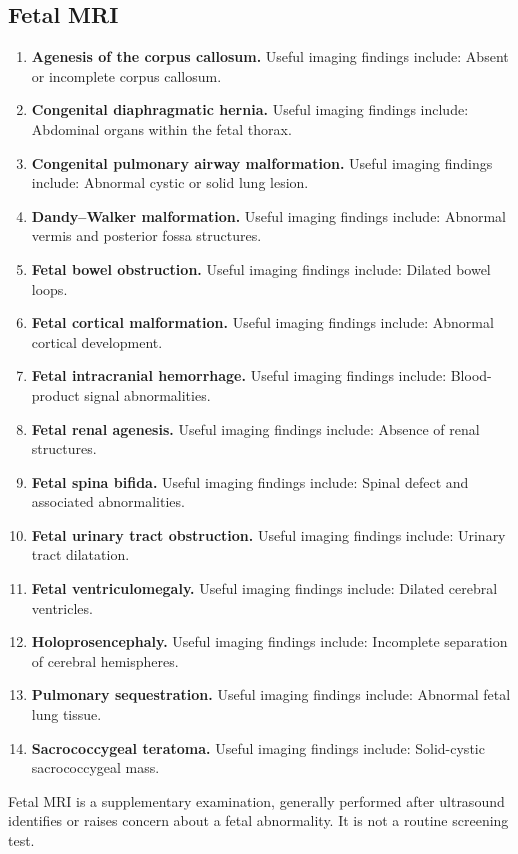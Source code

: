 \subsection{Fetal MRI}
\begin{enumerate}[leftmargin=*,itemsep=0.45em,topsep=0.4em]
\item \textbf{Agenesis of the corpus callosum.} Useful imaging findings include: Absent or incomplete corpus callosum.
\item \textbf{Congenital diaphragmatic hernia.} Useful imaging findings include: Abdominal organs within the fetal thorax.
\item \textbf{Congenital pulmonary airway malformation.} Useful imaging findings include: Abnormal cystic or solid lung lesion.
\item \textbf{Dandy--Walker malformation.} Useful imaging findings include: Abnormal vermis and posterior fossa structures.
\item \textbf{Fetal bowel obstruction.} Useful imaging findings include: Dilated bowel loops.
\item \textbf{Fetal cortical malformation.} Useful imaging findings include: Abnormal cortical development.
\item \textbf{Fetal intracranial hemorrhage.} Useful imaging findings include: Blood-product signal abnormalities.
\item \textbf{Fetal renal agenesis.} Useful imaging findings include: Absence of renal structures.
\item \textbf{Fetal spina bifida.} Useful imaging findings include: Spinal defect and associated abnormalities.
\item \textbf{Fetal urinary tract obstruction.} Useful imaging findings include: Urinary tract dilatation.
\item \textbf{Fetal ventriculomegaly.} Useful imaging findings include: Dilated cerebral ventricles.
\item \textbf{Holoprosencephaly.} Useful imaging findings include: Incomplete separation of cerebral hemispheres.
\item \textbf{Pulmonary sequestration.} Useful imaging findings include: Abnormal fetal lung tissue.
\item \textbf{Sacrococcygeal teratoma.} Useful imaging findings include: Solid-cystic sacrococcygeal mass.
\end{enumerate}

Fetal MRI is a supplementary examination, generally performed after ultrasound identifies or raises concern about a fetal abnormality. It is not a routine screening test.

